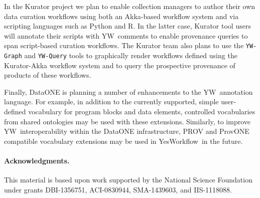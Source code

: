 \documentclass[15]{idcc}
\newcommand{\YW}{\textsf{YesWorkflow}}
\newcommand{\yw}{\textsf{YW}}
\newcommand{\ywm}[1]{\texttt{\small #1}}
\newcommand{\R}{R}
\begin{document}
In the Kurator project \cite{kuratorproject} we plan to enable
collection managers to author their own data curation workflows using
both an Akka-based workflow system and via scripting languages such as
Python and \R. In the latter case, Kurator tool users will annotate
their scripts with \yw\ comments to enable provenance queries to span
script-based curation workflows.
The Kurator team also plans to use the \ywm{YW-Graph} and
\ywm{YW-Query} tools to graphically render workflows defined using the
Kurator-Akka workflow system and to query the prospective provenance
of products of these workflows.

Finally, DataONE is planning a number of enhancements to the \yw\
annotation language. For example, in addition to the currently
supported, simple user-defined vocabulary for program blocks and data
elements, controlled vocabularies from shared ontologies may be used
with these extensions. Similarly, to improve \yw\ interoperability
within the DataONE infrastructure, PROV \cite{moreau2013prov} and
ProvONE \cite{dataone2014provone} compatible vocabulary extensions
may be used in \YW\ in the future.

\paragraph{Acknowledgments.} This material is based upon work
supported by the National Science Foundation under grants DBI-1356751,
ACI-0830944, SMA-1439603, and IIS-1118088.


\setcounter{secnumdepth}{0}

\end{document}
